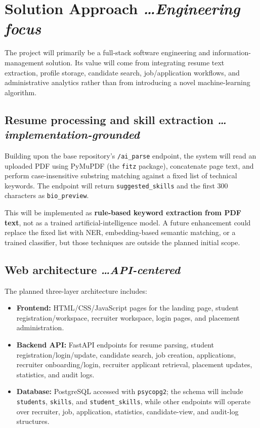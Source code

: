 \documentclass[11pt,a4paper]{article}
\newcommand{\BvrHint}[1]{%
  {\normalfont\normalsize\itshape\hfill #1}}
\begin{document}
\section{Solution Approach\BvrHint{\ldots Engineering focus}}
The project will primarily be a full-stack software engineering and information-management solution. Its value will come from integrating resume text extraction, profile storage, candidate search, job/application workflows, and administrative analytics rather than from introducing a novel machine-learning algorithm.

\subsection{Resume processing and skill extraction\BvrHint{\ldots implementation-grounded}}
Building upon the base repository's \texttt{/ai\_parse} endpoint, the system will read an uploaded PDF using PyMuPDF (the \texttt{fitz} package), concatenate page text, and perform case-insensitive substring matching against a fixed list of technical keywords. The endpoint will return \texttt{suggested\_skills} and the first 300 characters as \texttt{bio\_preview}. 

This will be implemented as \textbf{rule-based keyword extraction from PDF text}, not as a trained artificial-intelligence model. A future enhancement could replace the fixed list with NER, embedding-based semantic matching, or a trained classifier, but those techniques are outside the planned initial scope.

\subsection{Web architecture\BvrHint{\ldots API-centered}}
The planned three-layer architecture includes:
\begin{itemize}[leftmargin=0.7cm]
    \item \textbf{Frontend:} HTML/CSS/JavaScript pages for the landing page, student registration/workspace, recruiter workspace, login pages, and placement administration.
    \item \textbf{Backend API:} FastAPI endpoints for resume parsing, student registration/login/update, candidate search, job creation, applications, recruiter onboarding/login, recruiter applicant retrieval, placement updates, statistics, and audit logs.
    \item \textbf{Database:} PostgreSQL accessed with \texttt{psycopg2}; the schema will include \texttt{students}, \texttt{skills}, and \texttt{student\_skills}, while other endpoints will operate over recruiter, job, application, statistics, candidate-view, and audit-log structures. 
\end{itemize}
\end{document}
